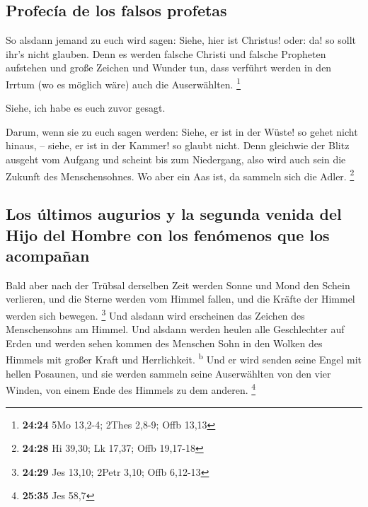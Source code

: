\hypertarget{profecuxeda-de-los-falsos-profetas}{%
\subsection{Profecía de los falsos
profetas}\label{profecuxeda-de-los-falsos-profetas}}

 So alsdann jemand zu euch wird sagen: Siehe, hier ist
Christus! oder: da! so sollt ihr's nicht glauben.  Denn
es werden falsche Christi und falsche Propheten aufstehen und große
Zeichen und Wunder tun, dass verführt werden in den Irrtum (wo es
möglich wäre) auch die Auserwählten. \footnote{\textbf{24:24} 5Mo
  13,2-4; 2Thes 2,8-9; Offb 13,13}

 Siehe, ich habe es euch zuvor gesagt.

 Darum, wenn sie zu euch sagen werden: Siehe, er ist in
der Wüste! so gehet nicht hinaus, -- siehe, er ist in der Kammer! so
glaubt nicht.  Denn gleichwie der Blitz ausgeht vom
Aufgang und scheint bis zum Niedergang, also wird auch sein die Zukunft
des Menschensohnes.  Wo aber ein Aas ist, da sammeln sich
die Adler. \footnote{\textbf{24:28} Hi 39,30; Lk 17,37; Offb 19,17-18}

\hypertarget{los-uxfaltimos-augurios-y-la-segunda-venida-del-hijo-del-hombre-con-los-fenuxf3menos-que-los-acompauxf1an}{%
\subsection{Los últimos augurios y la segunda venida del Hijo del Hombre
con los fenómenos que los
acompañan}\label{los-uxfaltimos-augurios-y-la-segunda-venida-del-hijo-del-hombre-con-los-fenuxf3menos-que-los-acompauxf1an}}

 Bald aber nach der Trübsal derselben Zeit werden Sonne
und Mond den Schein verlieren, und die Sterne werden vom Himmel fallen,
und die Kräfte der Himmel werden sich bewegen. \footnote{\textbf{24:29}
  Jes 13,10; 2Petr 3,10; Offb 6,12-13}  Und alsdann wird
erscheinen das Zeichen des Menschensohns am Himmel. Und alsdann werden
heulen alle Geschlechter auf Erden und werden sehen kommen des Menschen
Sohn in den Wolken des Himmels mit großer Kraft und Herrlichkeit.
\textsuperscript{b}  Und er wird senden seine Engel mit
hellen Posaunen, und sie werden sammeln seine Auserwählten von den vier
Winden, von einem Ende des Himmels zu dem anderen. \footnote{\textbf{25:35}
  Jes 58,7}

